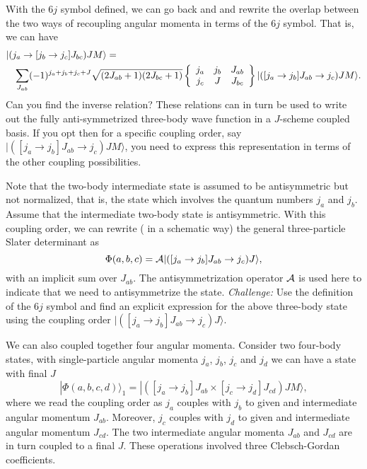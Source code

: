 With the $6j$ symbol defined, we can go back and and rewrite the overlap between the two ways of recoupling angular momenta in terms of the $6j$ symbol.
That is, we can have  \begin{eqnarray}
\nonumber
\lefteqn{| (j_a\rightarrow [j_b\rightarrow j_c]J_{bc}) JM\rangle = } \\
\nonumber
& &\sum_{J_{ab}}(-1)^{j_a+j_b+j_c+J}\sqrt{(2J_{ab}+1)(2J_{bc}+1)}\left\{\begin{array}{ccc} j_a & j_b& J_{ab} \\ j_c & J & J_{bc} \end{array}\right\}| ([j_a\rightarrow j_b]J_{ab}\rightarrow j_c) JM\rangle
. \nonumber
\end{eqnarray}
Can you find the inverse relation?  
These relations can in turn be used to write out the fully anti-symmetrized three-body wave function in a $J$-scheme coupled basis. 
If you opt then for a specific coupling order, say $| ([j_a\rightarrow j_b]J_{ab}\rightarrow j_c) JM\rangle$, you need to express this representation in terms of the other coupling possibilities. 

Note that the two-body intermediate state is assumed to be antisymmetric but
not normalized, that is, the state which involves the quantum numbers 
$j_a$ and $j_b$. Assume that the intermediate 
two-body state is antisymmetric. With this coupling order, we can 
rewrite ( in a schematic way) the general three-particle Slater determinant as 
\begin{equation}
\Phi(a,b,c) = {\cal A} | ([j_a\rightarrow j_b]J_{ab}\rightarrow j_c) J\rangle, 
\end{equation}
with an implicit sum over $J_{ab}$.  The antisymmetrization operator ${\cal A}$ is used here to indicate that we need to antisymmetrize the state.\newline
{\em Challenge:} Use the definition of the $6j$ symbol and find an explicit 
expression for the above three-body state using the coupling order $| ([j_a\rightarrow j_b]J_{ab}\rightarrow j_c) J\rangle$.

We can also coupled together four angular momenta. Consider two four-body states, with single-particle angular momenta $j_a$, $j_b$, $j_c$ and $j_d$ we can have a state with final $J$
\[
|\Phi(a,b,c,d)\rangle_1 = | ([j_a\rightarrow j_b]J_{ab}\times [j_c\rightarrow j_d]J_{cd}) JM\rangle, 
\]
where we read the coupling order as $j_a$ couples with $j_b$ to given and intermediate angular momentum $J_{ab}$. 
Moreover, $j_c$ couples with $j_d$ to given and intermediate angular momentum $J_{cd}$.  The two intermediate angular momenta $J_{ab}$ and $J_{cd}$
are in turn coupled to a final $J$.  These operations involved three Clebsch-Gordan coefficients. 

